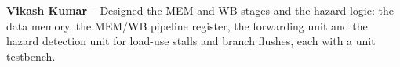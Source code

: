 \textbf{Vikash Kumar} -- Designed the MEM and WB stages and the hazard logic:
the data memory, the MEM/WB pipeline register, the forwarding unit and the hazard
detection unit for load-use stalls and branch flushes, each with a unit testbench.
